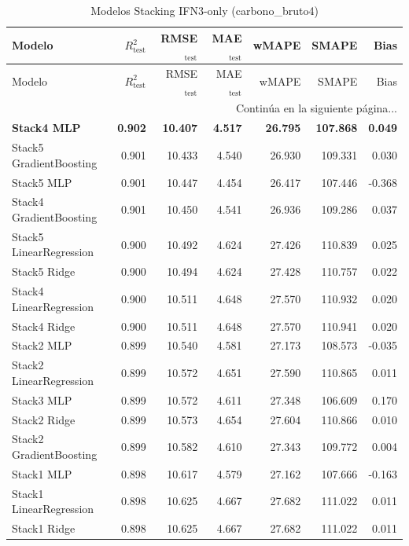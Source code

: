\begin{longtable}{lrrrrrr}
    \caption{Modelos Stacking IFN3-only (carbono_bruto4)}
    \label{tab:stack_ifn3_carbono_bruto4} \\
    \toprule
    Modelo & $R^2_{\text{test}}$ & RMSE$_{\text{test}}$ & MAE$_{\text{test}}$ & wMAPE & SMAPE & Bias \\
    \midrule
    \endfirsthead
    \toprule
    Modelo & $R^2_{\text{test}}$ & RMSE$_{\text{test}}$ & MAE$_{\text{test}}$ & wMAPE & SMAPE & Bias \\
    \midrule
    \endhead
    \midrule
    \multicolumn{7}{r}{{Continúa en la siguiente página...}} \\
    \endfoot
    \bottomrule
    \endlastfoot
    \textbf{Stack4 MLP} & \textbf{0.902} & \textbf{10.407} & \textbf{4.517} & \textbf{26.795} & \textbf{107.868} & \textbf{0.049} \\
    Stack5 GradientBoosting & 0.901 & 10.433 & 4.540 & 26.930 & 109.331 & 0.030 \\
    Stack5 MLP & 0.901 & 10.447 & 4.454 & 26.417 & 107.446 & -0.368 \\
    Stack4 GradientBoosting & 0.901 & 10.450 & 4.541 & 26.936 & 109.286 & 0.037 \\
    Stack5 LinearRegression & 0.900 & 10.492 & 4.624 & 27.426 & 110.839 & 0.025 \\
    Stack5 Ridge & 0.900 & 10.494 & 4.624 & 27.428 & 110.757 & 0.022 \\
    Stack4 LinearRegression & 0.900 & 10.511 & 4.648 & 27.570 & 110.932 & 0.020 \\
    Stack4 Ridge & 0.900 & 10.511 & 4.648 & 27.570 & 110.941 & 0.020 \\
    Stack2 MLP & 0.899 & 10.540 & 4.581 & 27.173 & 108.573 & -0.035 \\
    Stack2 LinearRegression & 0.899 & 10.572 & 4.651 & 27.590 & 110.865 & 0.011 \\
    Stack3 MLP & 0.899 & 10.572 & 4.611 & 27.348 & 106.609 & 0.170 \\
    Stack2 Ridge & 0.899 & 10.573 & 4.654 & 27.604 & 110.866 & 0.010 \\
    Stack2 GradientBoosting & 0.899 & 10.582 & 4.610 & 27.343 & 109.772 & 0.004 \\
    Stack1 MLP & 0.898 & 10.617 & 4.579 & 27.162 & 107.666 & -0.163 \\
    Stack1 LinearRegression & 0.898 & 10.625 & 4.667 & 27.682 & 111.022 & 0.011 \\
    Stack1 Ridge & 0.898 & 10.625 & 4.667 & 27.682 & 111.022 & 0.011 \\

\end{longtable}
